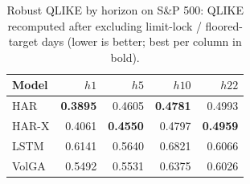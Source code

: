 \begin{table}[t]
\centering
\caption{Robust QLIKE by horizon on S\&P 500: QLIKE recomputed after excluding limit-lock / floored-target days (lower is better; best per column in bold).}
\label{tab:qlike_robust_sp500_clean}
\begin{tabular}{lrrrr}
\toprule
Model & $h1$ & $h5$ & $h10$ & $h22$ \\
\midrule
HAR & \textbf{0.3895} & 0.4605 & \textbf{0.4781} & 0.4993 \\
HAR-X & 0.4061 & \textbf{0.4550} & 0.4797 & \textbf{0.4959} \\
LSTM & 0.6141 & 0.5640 & 0.6821 & 0.6066 \\
VolGA & 0.5492 & 0.5531 & 0.6375 & 0.6026 \\
\bottomrule
\end{tabular}
\end{table}
